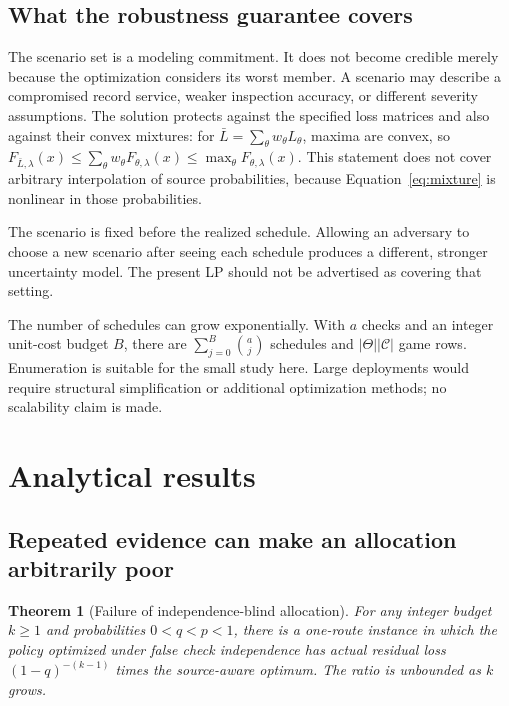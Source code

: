 \documentclass[11pt,letterpaper]{article}
\newtheorem{theorem}{Theorem}
\begin{document}
\subsection{What the robustness guarantee covers}

The scenario set is a modeling commitment. It does not become credible merely because the optimization considers its worst member. A scenario may describe a compromised record service, weaker inspection accuracy, or different severity assumptions. The solution protects against the specified loss matrices and also against their convex mixtures: for $\bar L=\sum_\theta w_\theta L_\theta$, maxima are convex, so
$F_{\bar L,\lambda}(x)\leq\sum_\theta w_\theta F_{\theta,\lambda}(x)\leq\max_\theta F_{\theta,\lambda}(x)$.
This statement does not cover arbitrary interpolation of source probabilities, because Equation~\ref{eq:mixture} is nonlinear in those probabilities.

The scenario is fixed before the realized schedule. Allowing an adversary to choose a new scenario after seeing each schedule produces a different, stronger uncertainty model. The present LP should not be advertised as covering that setting.

The number of schedules can grow exponentially. With $a$ checks and an integer unit-cost budget $B$, there are $\sum_{j=0}^{B}\binom{a}{j}$ schedules and $|\Theta||\mathcal C|$ game rows. Enumeration is suitable for the small study here. Large deployments would require structural simplification or additional optimization methods; no scalability claim is made.

\section{Analytical results}

\subsection{Repeated evidence can make an allocation arbitrarily poor}

\begin{theorem}[Failure of independence-blind allocation]
\label{thm:aliases}
For any integer budget $k\geq1$ and probabilities $0<q<p<1$, there is a one-route instance in which the policy optimized under false check independence has actual residual loss $(1-q)^{-(k-1)}$ times the source-aware optimum. The ratio is unbounded as $k$ grows.
\end{theorem}
\end{document}
